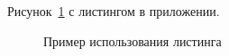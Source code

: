 
Рисунок~\ref{src:src3} с листингом в приложении.

\begin{figure}

\caption{Пример использования листинга}
\label{src:src3}
\end{figure}